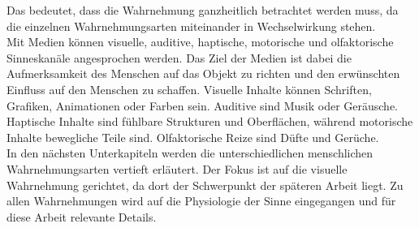 Das bedeutet, dass die Wahrnehmung ganzheitlich betrachtet werden muss, da die einzelnen Wahrnehmungsarten miteinander in Wechselwirkung stehen. \\
Mit Medien können visuelle, auditive, haptische, motorische und olfaktorische Sinneskanäle angesprochen werden. Das Ziel der Medien ist dabei die Aufmerksamkeit des Menschen auf das Objekt zu richten und den erwünschten Einfluss auf den Menschen zu schaffen. Visuelle Inhalte können Schriften, Grafiken, Animationen oder Farben sein. Auditive sind Musik oder Geräusche. Haptische Inhalte sind fühlbare Strukturen und Oberflächen, während motorische Inhalte bewegliche Teile sind. Olfaktorische Reize sind Düfte und Gerüche. \cite[Vgl. Seite 3]{Buhler.2017}\\
In den nächsten Unterkapiteln werden die unterschiedlichen menschlichen Wahrnehmungsarten vertieft erläutert. Der Fokus ist auf die visuelle Wahrnehmung gerichtet, da dort der Schwerpunkt der späteren Arbeit liegt. Zu allen Wahrnehmungen wird auf die Physiologie der Sinne eingegangen und für diese Arbeit relevante Details.
